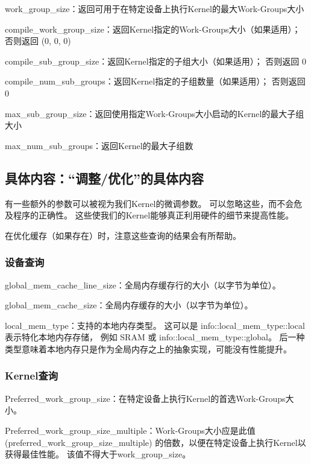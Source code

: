 work\_group\_size：返回可用于在特定设备上执行Kernel的最大Work-Groups大小

compile\_work\_group\_size：返回Kernel指定的Work-Groups大小（如果适用）； 否则返回 (0, 0, 0)

compile\_sub\_group\_size：返回Kernel指定的子组大小（如果适用）； 否则返回 0

compile\_num\_sub\_groups：返回Kernel指定的子组数量（如果适用）； 否则返回 0

max\_sub\_group\_size：返回使用指定Work-Groups大小启动的Kernel的最大子组大小

max\_num\_sub\_groups：返回Kernel的最大子组数

\subsection{具体内容：“调整/优化”的具体内容}
有一些额外的参数可以被视为我们Kernel的微调参数。 
可以忽略这些，而不会危及程序的正确性。 这些使我们的Kernel能够真正利用硬件的细节来提高性能。

\begin{remark}
	在优化缓存（如果存在）时，注意这些查询的结果会有所帮助。
\end{remark}

\subsubsection{设备查询}
global\_mem\_cache\_line\_size：全局内存缓存行的大小（以字节为单位）。

global\_mem\_cache\_size：全局内存缓存的大小（以字节为单位）。 

local\_mem\_type：支持的本地内存类型。 这可以是 info::local\_mem\_type::local 表示特化本地内存存储，
例如 SRAM 或 info::local\_mem\_type::global。 
后一种类型意味着本地内存只是作为全局内存之上的抽象实现，可能没有性能提升。

\subsubsection{Kernel查询}
Preferred\_work\_group\_size：在特定设备上执行Kernel的首选Work-Groups大小。

Preferred\_work\_group\_size\_multiple：Work-Groups大小应是此值 (preferred\_work\_group\_size\_multiple) 的倍数，以便在特定设备上执行Kernel以获得最佳性能。 
该值不得大于work\_group\_size。

